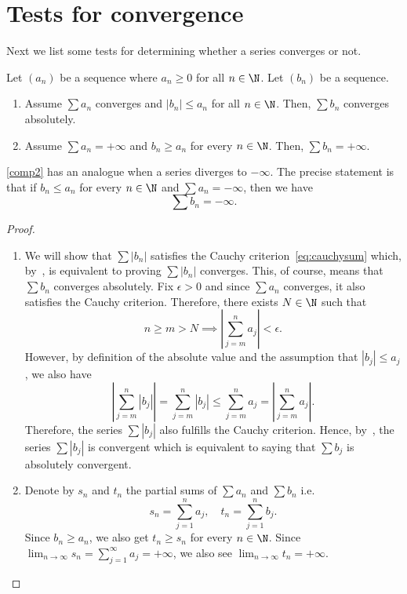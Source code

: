 \section{Tests for convergence}
Next we list some tests for determining whether a series converges or not.
\begin{thm}
	\label{thm:comptest}
	Let $(a_n)$ be a sequence where $a_n \ge 0$ for all $n\in\N$. Let $(b_n)$ be a sequence.
	\begin{enumerate}[label=\textbf{C\arabic*)}]
		\item \label{comp1} Assume $\sum a_n$ converges and $|b_n| \le a_n$ for all $n\in\N$. Then, $\sum b_n$ converges absolutely.
		\item \label{comp2} Assume $\sum a_n = +\infty$ and $b_n \ge a_n$ for every $n\in\N$. Then, $\sum b_n = +\infty$.
	\end{enumerate}
\end{thm}
\begin{rem}
	\ref{comp2} has an analogue when a series diverges to $-\infty$. The precise statement is that if $b_n\le a_n$ for every $n\in\N$ and $\sum a_n = -\infty$, then we have
	\[
	\sum b_n = -\infty.
	\]
\end{rem}
\begin{proof}
	\begin{enumerate}[label=\textbf{C\arabic*)}]
		\item We will show that $\sum |b_n|$ satisfies the Cauchy criterion~\eqref{eq:cauchysum} which, by~, is equivalent to proving $\sum |b_n|$ converges. This, of course, means that $\sum b_n$ converges absolutely. Fix $\epsilon>0$ and since $\sum a_n$ converges, it also satisfies the Cauchy criterion. Therefore, there exists $N\in\N$ such that
		\[
		n\ge m > N \implies \left|
		\sum_{j=m}^n a_j
		\right|<\epsilon.
		\]
		However, by definition of the absolute value and the assumption that $|b_j| \le a_j$, we also have
		\[
		\left|
		\sum_{j=m}^n |b_j|
		\right| = \sum_{j=m}^n |b_j| \le \sum_{j=m}^n a_j = \left|
		\sum_{j=m}^n a_j
		\right|.
		\]
		Therefore, the series $\sum |b_j|$ also fulfills the Cauchy criterion. Hence, by~, the series $\sum |b_j|$ is convergent which is equivalent to saying that $\sum b_j$ is absolutely convergent.
		\item Denote by $s_n$ and $t_n$ the partial sums of $\sum a_n$ and $\sum b_n$ i.e.
		\[
		s_n = \sum_{j=1}^n a_j, \quad t_n = \sum_{j=1}^n b_j.
		\]
		Since $b_n \ge a_n$, we also get $t_n \ge s_n$ for every $n\in\N$. Since $\lim_{n\to \infty} s_n = \sum_{j=1}^\infty a_j = +\infty$, we also see $\lim_{n\to\infty} t_n = +\infty$.
	\end{enumerate}
\end{proof}
